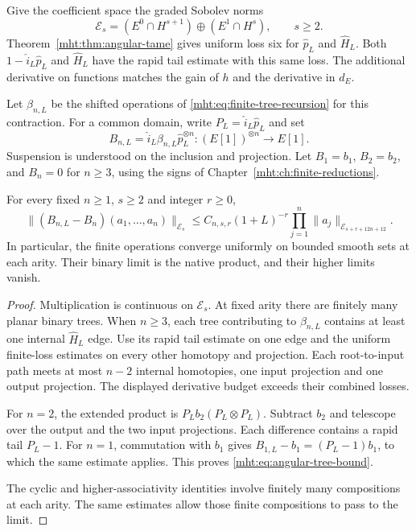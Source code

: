 Give the coefficient space the graded Sobolev norms
\[
 \mathcal E_s=(E^0\cap H^{s+1})\oplus(E^1\cap H^s),
 \qquad s\geq2.
\]
Theorem~\ref{mht:thm:angular-tame} gives uniform loss six for
$\widehat p_L$ and $\widehat H_L$. Both
$1-\widehat i_L\widehat p_L$ and $\widehat H_L$ have the rapid
tail estimate with this same loss. The additional derivative on
functions matches the gain of $h$ and the derivative in $d_E$.

Let $\beta_{n,L}$ be the shifted operations of
\eqref{mht:eq:finite-tree-recursion} for this contraction.
For a common domain, write $P_L=\widehat i_L\widehat p_L$ and set
\[
 B_{n,L}=\widehat i_L\beta_{n,L}\widehat p_L^{\otimes n}
       :(E[1])^{\otimes n}\longrightarrow E[1].
\]
Suspension is understood on the inclusion and projection. Let
$B_1=b_1$, $B_2=b_2$, and $B_n=0$ for $n\geq3$, using the
signs of Chapter~\ref{mht:ch:finite-reductions}.

\begin{theorem}\label{mht:thm:angular-tree-limit}
For every fixed $n\geq1$, $s\geq2$ and integer $r\geq0$,
\begin{equation}\label{mht:eq:angular-tree-bound}
 \|(B_{n,L}-B_n)(a_1,\ldots,a_n)\|_{\mathcal E_s}
 \leq C_{n,s,r}(1+L)^{-r}
          \prod_{j=1}^n\|a_j\|_{\mathcal E_{s+r+12n+12}}.
\end{equation}
In particular, the finite operations converge uniformly on bounded
smooth sets at each arity. Their binary limit is the native product,
and their higher limits vanish.
\end{theorem}

\begin{proof}
Multiplication is continuous on $\mathcal E_s$. At fixed arity
there are finitely many planar binary trees. When $n\geq3$, each
tree contributing to $\beta_{n,L}$ contains at least one internal
$\widehat H_L$ edge. Use its rapid tail estimate on one edge and
the uniform finite-loss estimates on every other homotopy and
projection. Each root-to-input path meets at most $n-2$ internal
homotopies, one input projection and one output projection.
The displayed derivative budget exceeds their combined losses.

For $n=2$, the extended product is $P_Lb_2(P_L\otimes P_L)$.
Subtract $b_2$ and telescope over the output and the two input
projections. Each difference contains a rapid tail $P_L-1$.
For $n=1$, commutation with $b_1$ gives
$B_{1,L}-b_1=(P_L-1)b_1$, to which the same estimate applies.
This proves \eqref{mht:eq:angular-tree-bound}.

The cyclic and higher-associativity identities involve finitely many
compositions at each arity. The same estimates allow those finite
compositions to pass to the limit.
\end{proof}

